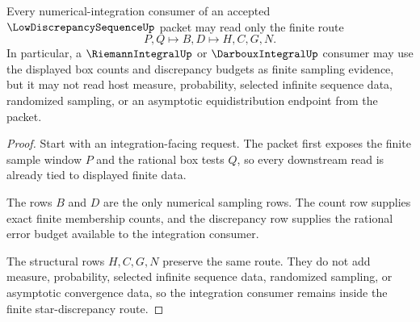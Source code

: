\begin{theorem}
\label{thm:low-discrepancy-sequence-star-discrepancy-route}
Every numerical-integration consumer of an accepted $\LowDiscrepancySequenceUp$ packet may read only the finite route
$$
P,Q \longmapsto B,D \longmapsto H,C,G,N .
$$
In particular, a $\RiemannIntegralUp$ or $\DarbouxIntegralUp$ consumer may use the displayed box counts and discrepancy budgets as finite sampling evidence, but it may not read host measure, probability, selected infinite sequence data, randomized sampling, or an asymptotic equidistribution endpoint from the packet.
\end{theorem}
\begin{proof}
Start with an integration-facing request. The packet first exposes the finite sample window $P$ and the rational box tests $Q$, so every downstream read is already tied to displayed finite data.

The rows $B$ and $D$ are the only numerical sampling rows. The count row supplies exact finite membership counts, and the discrepancy row supplies the rational error budget available to the integration consumer.

The structural rows $H,C,G,N$ preserve the same route. They do not add measure, probability, selected infinite sequence data, randomized sampling, or asymptotic convergence data, so the integration consumer remains inside the finite star-discrepancy route.
\end{proof}


\begin{closurestatus}{\LowDiscrepancySequenceUp}
  \theoryclosure{\seedClosure}
  \formalstatus{\unformalizedV}
\end{closurestatus}

